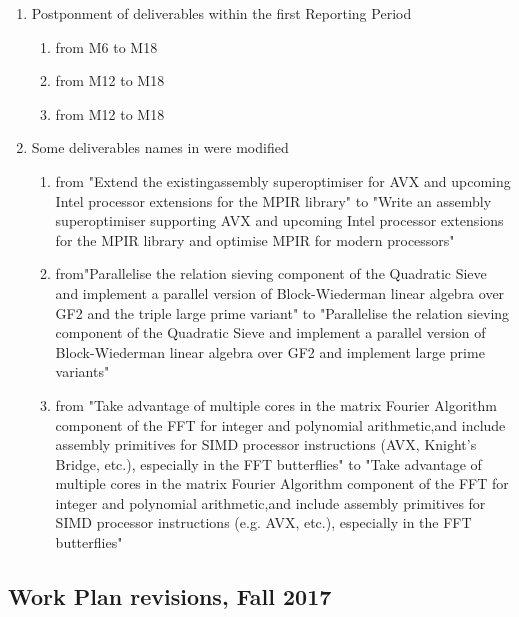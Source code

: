 \begin{enumerate}
\item Postponment of deliverables within the first Reporting Period
\begin{enumerate}
\item {} from M6 to M18
\item {} from M12 to M18
\item {} from M12 to M18
\end{enumerate}

\item Some deliverables names in  were modified
\begin{enumerate}
\item {} from "Extend the existingassembly superoptimiser
for AVX and upcoming Intel processor extensions for the MPIR library" to "Write an assembly
superoptimiser supporting AVX and upcoming Intel processor extensions for the MPIR library
and optimise MPIR for modern processors"
\item {} from"Parallelise the relation sieving component of the
Quadratic Sieve and implement a parallel version of Block-Wiederman linear algebra over GF2
and the triple large prime variant" to "Parallelise the relation sieving component of the
Quadratic Sieve and implement a parallel version of Block-Wiederman linear algebra over GF2
and implement large prime variants"
\item {} from "Take advantage of multiple cores in the matrix Fourier Algorithm
component of the FFT for integer and polynomial arithmetic,and include assembly primitives for
SIMD processor instructions (AVX, Knight's Bridge, etc.), especially in the FFT butterflies" to
"Take advantage of multiple cores in the matrix Fourier Algorithm component of the FFT for
integer and polynomial arithmetic,and include assembly primitives for SIMD processor
instructions (e.g. AVX, etc.), especially in the FFT butterflies"
\end{enumerate}

\end{enumerate}

\clearpage
\thispagestyle{empty}
\subsection*{Work Plan revisions, Fall 2017}

